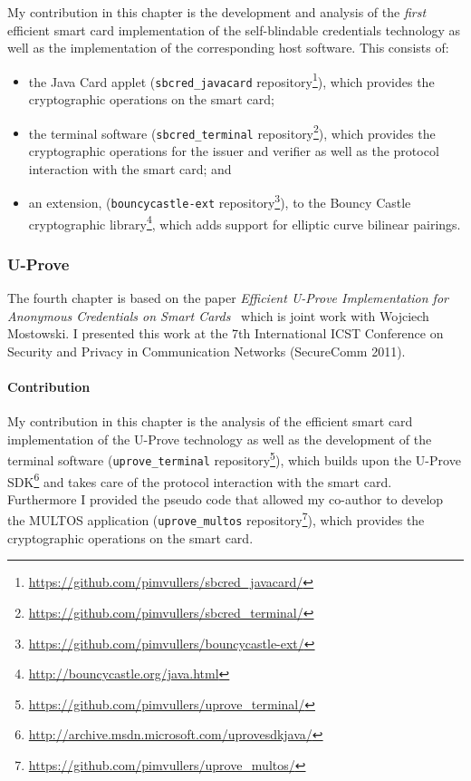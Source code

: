 My contribution in this chapter is the development and analysis of the
\emph{first} efficient smart card implementation of the self-blindable
credentials technology as well as the implementation of the corresponding host
software. This consists of:
\begin{itemize}
  \item the Java Card applet (\texttt{sbcred\_javacard} repository\footnote{%
    \url{https://github.com/pimvullers/sbcred_javacard/}}),
    which provides the cryptographic operations on the smart card;
  \item the terminal software (\texttt{sbcred\_terminal} repository\footnote{%
    \url{https://github.com/pimvullers/sbcred_terminal/}}),
    which provides the cryptographic operations for the issuer and verifier as
    well as the protocol interaction with the smart card; and
  \item an extension, (\texttt{bouncycastle-ext} repository\footnote{%
    \url{https://github.com/pimvullers/bouncycastle-ext/}}),
    to the Bouncy Castle cryptographic library\footnote{%
    \url{http://bouncycastle.org/java.html}}, which adds support for elliptic
    curve bilinear pairings.
\end{itemize}

\subsubsection{U-Prove}

The fourth chapter is based on the paper \emph{Efficient U-Prove Implementation
for Anonymous Credentials on Smart Cards}~\cite{MostowskiVullers11} which is
joint work with Wojciech Mostowski. I presented this work at the 7th
International ICST Conference on Security and Privacy in Communication Networks
(SecureComm 2011).

\paragraph{Contribution}

My contribution in this chapter is the analysis of the efficient smart card
implementation of the U-Prove technology as well as the development of the
terminal software (\texttt{uprove\_terminal} repository\footnote{%
\url{https://github.com/pimvullers/uprove_terminal/}}), which builds upon the
U-Prove SDK\footnote{\url{http://archive.msdn.microsoft.com/uprovesdkjava/}}
and takes care of the protocol interaction with the smart card. Furthermore I
provided the pseudo code that allowed my co-author to develop the MULTOS
application (\texttt{uprove\_multos} repository\footnote{%
\url{https://github.com/pimvullers/uprove_multos/}}), which provides the
cryptographic operations on the smart card.

